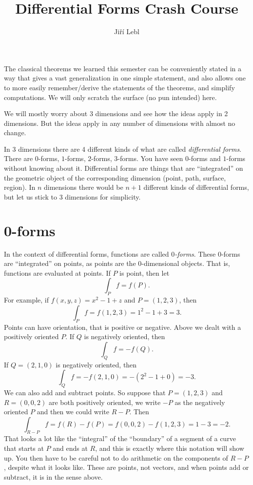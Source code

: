 \documentclass[12pt]{article}
\title{Differential Forms Crash Course}
\author{Ji\v{r}\'i Lebl}
\begin{document}
\maketitle


The classical theorems we learned this semester can be conveniently stated
in a way that gives a vast generalization in one simple statement,
and also allows one to more easily remember/derive the statements of the
theorems, and simplify computations.
We will only scratch the surface (no pun intended) here.

We will mostly worry about 3 dimensions and see how the ideas apply in 2
dimensions.  But the ideas apply in any number of dimensions with almost
no change.

In 3 dimensions there are 4
different kinds of what are called \emph{differential forms}.
There are $0$-forms, $1$-forms, $2$-forms,
$3$-forms.  You have seen $0$-forms and $1$-forms without knowing
about it.  Differential forms are things that are ``integrated'' on the
geometric object of the corresponding dimension (point, path, surface,
region).  In $n$ dimensions there would be $n+1$ different kinds of
differential forms, but let us stick to 3 dimensions for simplicity.

\section*{0-forms}

In the context of differential forms,
functions are called \emph{$0$-forms}.  These $0$-forms are ``integrated''
on points, as points are the $0$-dimensional objects.
That is, functions are evaluated at points.  If $P$ is point, then let
$$
\int_P f = f(P) .
$$
For example,
if $f(x,y,z) = x^2-1+z$ and $P=(1,2,3)$, then
$$
\int_P f = f(1,2,3) = 1^2-1+3 =3 .
$$
Points can have orientation, that is positive or negative.  Above we dealt
with a positively oriented $P$.  If $Q$ is negatively oriented, then 
$$
\int_Q f = -f(Q).
$$
If $Q = (2,1,0)$ is negatively oriented, then
$$
\int_Q f = -f(2,1,0) = -( 2^2-1+0 ) = -3.
$$
We can also add and subtract points.  So suppose that $P=(1,2,3)$ and
$R = (0,0,2)$ are both positively oriented, we write $-P$ as the negatively
oriented $P$ and then we could write $R-P$.  Then
$$
\int_{R-P} f = f(R)-f(P) = f(0,0,2)-f(1,2,3) = 1-3 = -2.
$$
That looks a lot like the ``integral'' of the ``boundary'' of a segment of
a curve that starts at $P$ and ends at $R$, and this is exactly where this
notation will show up.
You then have to be careful
not to do arithmetic on the components of $R-P$, despite what it looks like.
These are points, not vectors, and when points add or subtract, it is in the
sense above.
\end{document}
